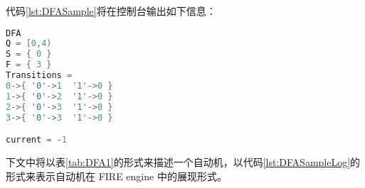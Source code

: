 代码\ref{lst:DFASample}将在控制台输出如下信息：
\lstset{style=mystyle}
\begin{lstlisting}[language=C++,label={lst:DFASampleLog},caption={图\ref{fig:DFA1}中自动机在 FIRE engine 中的表现形式}]
DFA
Q = [0,4)
S = { 0 }
F = { 3 }
Transitions =
0->{ '0'->1  '1'->0 }
1->{ '0'->2  '1'->0 }
2->{ '0'->3  '1'->0 }
3->{ '0'->3  '1'->0 }

current = -1
\end{lstlisting}

下文中将以表\ref{tab:DFA1}的形式来描述一个自动机，以代码\ref{lst:DFASampleLog}的形式来表示自动机在 FIRE engine 中的展现形式。